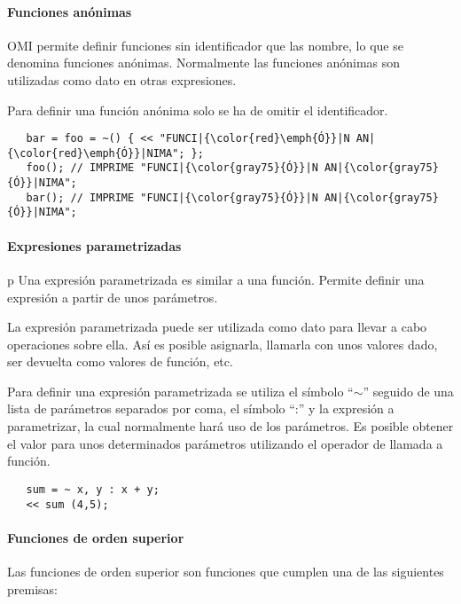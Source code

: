 \paragraph{Funciones anónimas}
OMI permite definir funciones sin identificador que las nombre, lo que se denomina funciones 
anónimas. Normalmente las funciones anónimas son utilizadas
como dato en otras expresiones. 

Para definir una función anónima solo se ha de omitir el identificador. \\


\begin{lstlisting} 
   bar = foo = ~() { << "FUNCI|{\color{red}\emph{Ó}}|N AN|{\color{red}\emph{Ó}}|NIMA"; };
   foo(); // IMPRIME "FUNCI|{\color{gray75}{Ó}}|N AN|{\color{gray75}{Ó}}|NIMA"; 
   bar(); // IMPRIME "FUNCI|{\color{gray75}{Ó}}|N AN|{\color{gray75}{Ó}}|NIMA"; 
\end{lstlisting}



\paragraph{Expresiones parametrizadas}
p
Una expresión parametrizada es similar a una función. Permite definir una expresión a partir de unos parámetros. 

La expresión parametrizada puede ser utilizada como dato para llevar a cabo operaciones sobre ella. Así es posible asignarla, 
llamarla con unos valores dado, ser devuelta como valores de función, etc.

Para definir una expresión parametrizada se utiliza el símbolo ``$\sim$'' seguido de una lista de parámetros separados por coma, el símbolo ``:'' y la expresión 
a parametrizar, la cual normalmente hará uso de los parámetros. Es posible obtener el valor para unos determinados parámetros utilizando 
el operador de llamada a función. \\

\begin{lstlisting} 
   sum = ~ x, y : x + y;
   << sum (4,5); 
\end{lstlisting}


\paragraph{Funciones de orden superior}

Las funciones de orden superior son funciones que cumplen una de las siguientes premisas:

